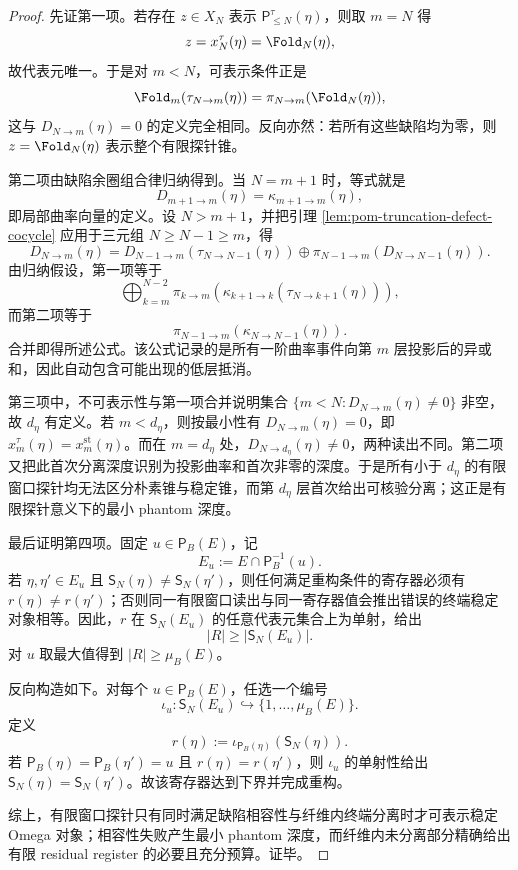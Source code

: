 \begin{proof}
先证第一项。若存在 \(z\in X_N\) 表示 \(\mathsf P^\tau_{\le N}(\eta)\)，则取 \(m=N\) 得
\[
z=x_N^\tau(\eta)=\Fold_N(\eta),
\]
故代表元唯一。于是对 \(m<N\)，可表示条件正是
\[
\Fold_m(\tau_{N\to m}(\eta))
=\pi_{N\to m}(\Fold_N(\eta)),
\]
这与 \(D_{N\to m}(\eta)=0\) 的定义完全相同。反向亦然：若所有这些缺陷均为零，则 \(z=\Fold_N(\eta)\) 表示整个有限探针锥。

第二项由缺陷余圈组合律归纳得到。当 \(N=m+1\) 时，等式就是
\[
D_{m+1\to m}(\eta)=\kappa_{m+1\to m}(\eta),
\]
即局部曲率向量的定义。设 \(N>m+1\)，并把引理 \ref{lem:pom-truncation-defect-cocycle} 应用于三元组 \(N\ge N-1\ge m\)，得
\[
D_{N\to m}(\eta)
=
D_{N-1\to m}(\tau_{N\to N-1}(\eta))
\oplus
\pi_{N-1\to m}(D_{N\to N-1}(\eta)).
\]
由归纳假设，第一项等于
\[
\bigoplus_{k=m}^{N-2}
\pi_{k\to m}\!\left(
\kappa_{k+1\to k}(\tau_{N\to k+1}(\eta))
\right),
\]
而第二项等于
\[
\pi_{N-1\to m}\!\left(
\kappa_{N\to N-1}(\eta)
\right).
\]
合并即得所述公式。该公式记录的是所有一阶曲率事件向第 \(m\) 层投影后的异或和，因此自动包含可能出现的低层抵消。

第三项中，不可表示性与第一项合并说明集合
\(\{m<N:D_{N\to m}(\eta)\ne0\}\) 非空，故 \(d_\eta\) 有定义。若 \(m<d_\eta\)，则按最小性有 \(D_{N\to m}(\eta)=0\)，即
\(x_m^\tau(\eta)=x_m^{\mathrm{st}}(\eta)\)。而在 \(m=d_\eta\) 处，\(D_{N\to d_\eta}(\eta)\ne0\)，两种读出不同。第二项又把此首次分离深度识别为投影曲率和首次非零的深度。于是所有小于 \(d_\eta\) 的有限窗口探针均无法区分朴素锥与稳定锥，而第 \(d_\eta\) 层首次给出可核验分离；这正是有限探针意义下的最小 phantom 深度。

最后证明第四项。固定 \(u\in\mathsf P_B(E)\)，记
\[
E_u:=E\cap\mathsf P_B^{-1}(u).
\]
若 \(\eta,\eta'\in E_u\) 且 \(\mathsf S_N(\eta)\ne\mathsf S_N(\eta')\)，则任何满足重构条件的寄存器必须有 \(r(\eta)\ne r(\eta')\)；否则同一有限窗口读出与同一寄存器值会推出错误的终端稳定对象相等。因此，\(r\) 在 \(\mathsf S_N(E_u)\) 的任意代表元集合上为单射，给出
\[
|R|\ge |\mathsf S_N(E_u)|.
\]
对 \(u\) 取最大值得到 \(|R|\ge\mu_B(E)\)。

反向构造如下。对每个 \(u\in\mathsf P_B(E)\)，任选一个编号
\[
\iota_u:\mathsf S_N(E_u)\hookrightarrow\{1,\ldots,\mu_B(E)\}.
\]
定义
\[
r(\eta):=\iota_{\mathsf P_B(\eta)}(\mathsf S_N(\eta)).
\]
若 \(\mathsf P_B(\eta)=\mathsf P_B(\eta')=u\) 且 \(r(\eta)=r(\eta')\)，则 \(\iota_u\) 的单射性给出
\(\mathsf S_N(\eta)=\mathsf S_N(\eta')\)。故该寄存器达到下界并完成重构。

综上，有限窗口探针只有同时满足缺陷相容性与纤维内终端分离时才可表示稳定 Omega 对象；相容性失败产生最小 phantom 深度，而纤维内未分离部分精确给出有限 residual register 的必要且充分预算。证毕。
\end{proof}

